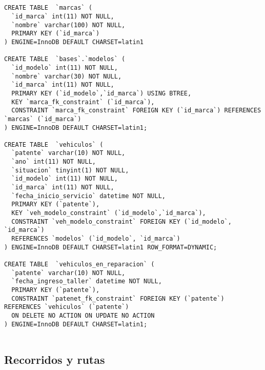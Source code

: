 \begin{verbatim}


CREATE TABLE  `marcas` (
  `id_marca` int(11) NOT NULL,
  `nombre` varchar(100) NOT NULL,
  PRIMARY KEY (`id_marca`)
) ENGINE=InnoDB DEFAULT CHARSET=latin1

CREATE TABLE  `bases`.`modelos` (
  `id_modelo` int(11) NOT NULL,
  `nombre` varchar(30) NOT NULL,
  `id_marca` int(11) NOT NULL,
  PRIMARY KEY (`id_modelo`,`id_marca`) USING BTREE,
  KEY `marca_fk_constraint` (`id_marca`),
  CONSTRAINT `marca_fk_constraint` FOREIGN KEY (`id_marca`) REFERENCES `marcas` (`id_marca`)
) ENGINE=InnoDB DEFAULT CHARSET=latin1;

CREATE TABLE  `vehiculos` (
  `patente` varchar(10) NOT NULL,
  `ano` int(11) NOT NULL,
  `situacion` tinyint(1) NOT NULL,
  `id_modelo` int(11) NOT NULL,
  `id_marca` int(11) NOT NULL,
  `fecha_inicio_servicio` datetime NOT NULL,
  PRIMARY KEY (`patente`),
  KEY `veh_modelo_constraint` (`id_modelo`,`id_marca`),
  CONSTRAINT `veh_modelo_constraint` FOREIGN KEY (`id_modelo`, `id_marca`) 
  REFERENCES `modelos` (`id_modelo`, `id_marca`)
) ENGINE=InnoDB DEFAULT CHARSET=latin1 ROW_FORMAT=DYNAMIC;

CREATE TABLE  `vehiculos_en_reparacion` (
  `patente` varchar(10) NOT NULL,
  `fecha_ingreso_taller` datetime NOT NULL,
  PRIMARY KEY (`patente`),
  CONSTRAINT `patenet_fk_constraint` FOREIGN KEY (`patente`) REFERENCES `vehiculos` (`patente`) 
  ON DELETE NO ACTION ON UPDATE NO ACTION
) ENGINE=InnoDB DEFAULT CHARSET=latin1;


\end{verbatim}

\subsection{Recorridos y rutas}

